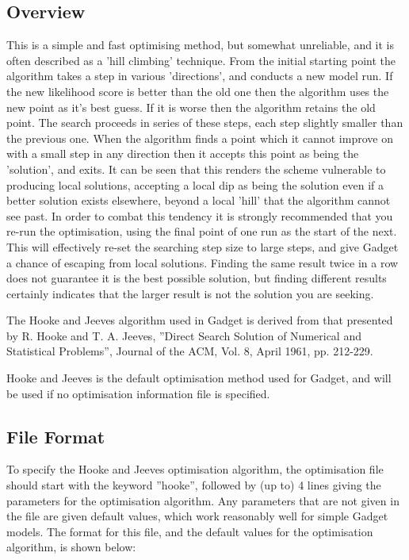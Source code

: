 \documentclass [a4paper, 10pt]{book}
\begin{document}
\subsection{Overview}
This is a simple and fast optimising method, but somewhat unreliable, and it is often described as a 'hill climbing' technique.  From the initial starting point the algorithm takes a step in various 'directions', and conducts a new model run.  If the new likelihood score is better than the old one then the algorithm uses the new point as it's best guess.  If it is worse then the algorithm retains the old point. The search proceeds in series of these steps, each step slightly smaller than the previous one.  When the algorithm finds a point which it cannot improve on with a small step in any direction then it accepts this point as being the 'solution', and exits.  It can be seen that this renders the scheme vulnerable to producing local solutions, accepting a local dip as being the solution even if a better solution exists elsewhere, beyond a local 'hill' that the algorithm cannot see past.  In order to combat this tendency it is strongly recommended that you re-run the optimisation, using the final point of one run as the start of the next.  This will effectively re-set the searching step size to large steps, and give Gadget a chance of escaping from local solutions.  Finding the same result twice in a row does not guarantee it is the best possible solution, but finding different results certainly indicates that the larger result is not the solution you are seeking.

\bigskip
The Hooke and Jeeves algorithm used in Gadget is derived from that presented by R. Hooke and T. A. Jeeves, ''Direct Search Solution of Numerical and Statistical Problems'', Journal of the ACM, Vol. 8, April 1961, pp. 212-229.

\bigskip
Hooke and Jeeves is the default optimisation method used for Gadget, and will be used if no optimisation information file is specified.

\subsection{File Format}
To specify the Hooke and Jeeves optimisation algorithm, the optimisation file should start with the keyword ''hooke'', followed by (up to) 4 lines giving the parameters for the optimisation algorithm.  Any parameters that are not given in the file are given default values, which work reasonably well for simple Gadget models.  The format for this file, and the default values for the optimisation algorithm, is shown below:
\end{document}
